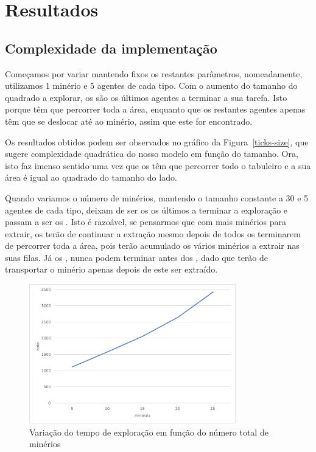 \documentclass[12pt]{report}
\begin{document}
\section{Resultados}

\subsection{Complexidade da implementação}

Começamos por variar \size mantendo fixos os restantes parâmetros, nomeadamente, utilizamos 1 minério e 5 agentes de cada tipo. Com o aumento do tamanho do quadrado a explorar, os \spotters são os últimos agentes a terminar a sua tarefa. Isto porque têm que percorrer toda a área, enquanto que os restantes agentes apenas têm que se deslocar até ao minério, assim que este for encontrado. 

Os resultados obtidos podem ser observados no gráfico da Figura~\ref{ticks-size}, que sugere complexidade quadrática do nosso modelo em função do tamanho. Ora, isto faz imenso sentido uma vez que os \spotters têm que percorrer todo o tabuleiro e a sua área é igual ao quadrado do tamanho do lado.

\FloatBarrier

Quando variamos o número de minérios, mantendo o tamanho constante a 30 e 5 agentes de cada tipo, deixam de ser os \spotters os últimos a terminar a exploração e passam a ser os \transporters. Isto é razoável, se pensarmos que com mais minérios para extrair, os \producers terão de continuar a extração mesmo depois de todos os \spotters terminarem de percorrer toda a área, pois terão acumulado os vários minérios a extrair nas suas filas. Já os \transporters, nunca podem terminar antes dos \producers, dado que terão de transportar o minério apenas depois de este ser extraído.

\begin{figure}[h]
	\centering
    \includegraphics[width=0.8\textwidth]{ticks-minerals}
	\caption{Variação do tempo de exploração em função do número total de minérios}
	\label{ticks-minerals}
\end{figure}
\end{document}
